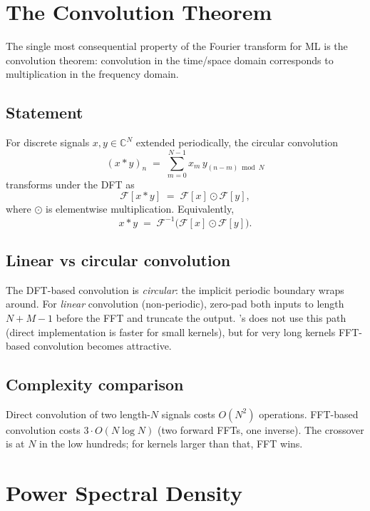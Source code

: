 \section{The Convolution Theorem}
\label{sec:fft:convolution_theorem}

The single most consequential property of the Fourier transform
for ML is the convolution theorem: convolution in the time/space
domain corresponds to multiplication in the frequency domain.

\subsection{Statement}
\label{ssec:fft:conv_thm_statement}

For discrete signals $x, y \in \mathbb{C}^N$ extended
periodically, the circular convolution
\[
(x * y)_n \;=\; \sum_{m=0}^{N-1} x_m\, y_{(n-m) \bmod N}
\]
transforms under the DFT as
\[
\mathcal{F}[x * y] \;=\; \mathcal{F}[x] \odot \mathcal{F}[y],
\]
where $\odot$ is elementwise multiplication. Equivalently,
\[
x * y \;=\; \mathcal{F}^{-1}\bigl(\mathcal{F}[x] \odot \mathcal{F}[y]\bigr).
\]

\subsection{Linear vs circular convolution}
\label{ssec:fft:linear_vs_circular}

The DFT-based convolution is \emph{circular}: the implicit
periodic boundary wraps around. For \emph{linear} convolution
(non-periodic), zero-pad both inputs to length $N + M - 1$
before the FFT and truncate the output. \Lucid's
 does not use this path (direct
implementation is faster for small kernels), but for very long
kernels FFT-based convolution becomes attractive.

\subsection{Complexity comparison}
\label{ssec:fft:conv_complexity}

Direct convolution of two length-$N$ signals costs $O(N^2)$
operations. FFT-based convolution costs $3 \cdot O(N \log N)$
(two forward FFTs, one inverse). The crossover is at $N$
in the low hundreds; for kernels larger than that, FFT wins.

\section{Power Spectral Density}
\label{sec:fft:psd}

